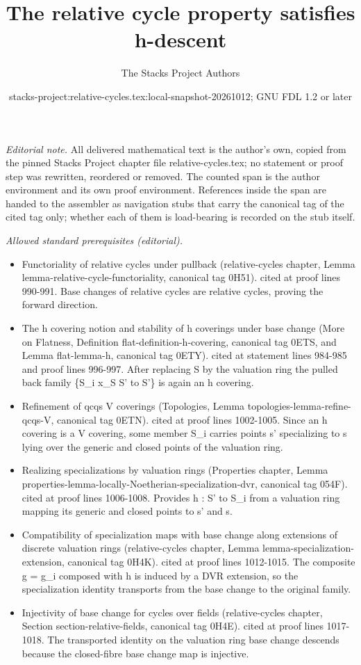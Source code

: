 \documentclass{stacks-project}
\title{The relative cycle property satisfies h-descent}
\author{The Stacks Project Authors}
\date{stacks-project:relative-cycles.tex:local-snapshot-20261012; GNU FDL 1.2 or later}
\theoremstyle{plain}
\theoremstyle{definition}
\theoremstyle{remark}
\numberwithin{equation}{subsection}
\begin{document}
\maketitle
\setcounter{subsection}{1}
\noindent\textit{Editorial note.} All delivered mathematical text is the author's own, copied from the pinned Stacks Project chapter file relative-cycles.tex; no statement or proof step was rewritten, reordered or removed. The counted span is the author environment and its own proof environment. References inside the span are handed to the assembler as navigation stubs that carry the canonical tag of the cited tag only; whether each of them is load-bearing is recorded on the stub itself.\par\medskip
\noindent\textit{Allowed standard prerequisites (editorial).}\begin{itemize}
\item Functoriality of relative cycles under pullback (relative-cycles chapter, Lemma lemma-relative-cycle-functoriality, canonical tag 0H51). cited at proof lines 990-991. Base changes of relative cycles are relative cycles, proving the forward direction.
\item The h covering notion and stability of h coverings under base change (More on Flatness, Definition flat-definition-h-covering, canonical tag 0ETS, and Lemma flat-lemma-h, canonical tag 0ETY). cited at statement lines 984-985 and proof lines 996-997. After replacing S by the valuation ring the pulled back family \{S\_i x\_S S' to S'\} is again an h covering.
\item Refinement of qcqs V coverings (Topologies, Lemma topologies-lemma-refine-qcqs-V, canonical tag 0ETN). cited at proof lines 1002-1005. Since an h covering is a V covering, some member S\_i carries points s' specializing to s lying over the generic and closed points of the valuation ring.
\item Realizing specializations by valuation rings (Properties chapter, Lemma properties-lemma-locally-Noetherian-specialization-dvr, canonical tag 054F). cited at proof lines 1006-1008. Provides h : S' to S\_i from a valuation ring mapping its generic and closed points to s' and s.
\item Compatibility of specialization maps with base change along extensions of discrete valuation rings (relative-cycles chapter, Lemma lemma-specialization-extension, canonical tag 0H4K). cited at proof lines 1012-1015. The composite g = g\_i composed with h is induced by a DVR extension, so the specialization identity transports from the base change to the original family.
\item Injectivity of base change for cycles over fields (relative-cycles chapter, Section section-relative-fields, canonical tag 0H4E). cited at proof lines 1017-1018. The transported identity on the valuation ring base change descends because the closed-fibre base change map is injective.
\end{itemize}\medskip
\end{document}
